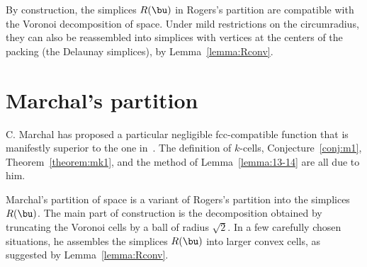 By construction, the simplices $R(\bu)$ in Rogers's partition are
compatible with the Voronoi decomposition of space.  Under mild
restrictions on the circumradius, they can also be reassembled into
simplices with vertices at the centers of the packing (the Delaunay
simplices), by Lemma~\ref{lemma:Rconv}.
%
%

\section{Marchal's partition}

C. Marchal has proposed a particular negligible fcc-compatible
function that is manifestly superior to the one
in~\cite{Hales:2006:DCG}.  The definition of $k$-cells,
Conjecture~\ref{conj:m1}, Theorem~\ref{theorem:mk1}, and the method of
Lemma~\ref{lemma:13-14} are all due to him.  %


Marchal's partition of space is a variant of Rogers's partition into
the simplices $R(\bu)$.  The main part of construction is the
decomposition obtained by truncating the Voronoi cells by a ball of
radius $\sqrt2$.  In a few carefully chosen situations, he assembles
the simplices $R(\bu)$ into larger convex cells, as suggested by
Lemma~\ref{lemma:Rconv}.



